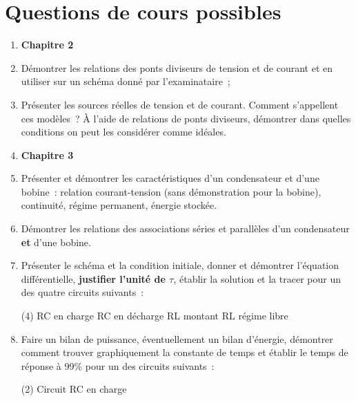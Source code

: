\documentclass[a4paper, 12pt, final, garamond]{book}
\begin{document}
\section{Questions de cours possibles}
\begin{enumerate}
	\item[] \textbf{Chapitre 2}
	\item Démontrer les relations des ponts diviseurs de tension et de courant
	      et en utiliser sur un schéma donné par l'examinataire~;
	\item Présenter les sources réelles de tension et de courant. Comment
	      s'appellent ces modèles~? À l'aide de relations de ponts diviseurs,
	      démontrer dans quelles conditions on peut les considérer comme idéales.
	\item[] \textbf{Chapitre 3}
	\item Présenter et démontrer les caractéristiques d'un condensateur et d'une
	      bobine~: relation courant-tension (sans démonstration pour la bobine),
	      continuité, régime permanent, énergie stockée.
	\item Démontrer les relations des associations séries et parallèles
	      d'un condensateur \textbf{et} d'une bobine.
	\item Présenter le schéma et la condition initiale, donner et démontrer
        l'équation différentielle, \textbf{justifier l'unité de $\tau$}, établir
        la solution et la tracer pour un des quatre circuits suivants~:
	      \begin{tasks}[label=\protect\fbox{\Alph*}, label-width=4ex](4)
		      \task RC en charge
		      \task RC en décharge
		      \task RL montant
		      \task RL régime libre
	      \end{tasks}
	\item Faire un bilan de puissance, éventuellement un bilan d'énergie,
        démontrer comment trouver graphiquement la constante de temps et établir
        le temps de réponse à 99\% pour un des circuits suivants~:
	      \begin{tasks}[label=\protect\fbox{\Alph*}, label-width=4ex](2)
		      \task Circuit RC en charge

\end{tasks}
\end{enumerate}
\end{document}
